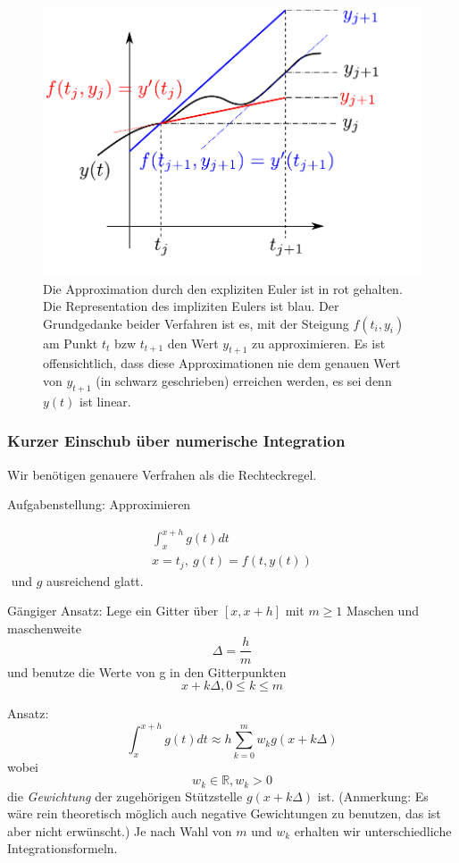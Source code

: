 \documentclass[10pt,a4paper]{article}
\begin{document}
\begin{figure}[H]
\includegraphics[width=\textwidth]{images/eulers_compared}
\caption{Die Approximation durch den expliziten Euler ist in rot gehalten. Die Representation des impliziten Eulers ist blau. Der Grundgedanke beider Verfahren ist es, mit der Steigung $f(t_i,y_i)$ am Punkt $t_t$ bzw $t_{t+1}$ den Wert $y_{t+1}$ zu approximieren. Es ist offensichtlich, dass diese Approximationen nie dem genauen Wert von $y_{t+1}$ (in schwarz geschrieben) erreichen werden, es sei denn $y(t)$ ist linear.}
\end{figure}

\subsubsection{Kurzer Einschub über numerische Integration}
Wir benötigen genauere Verfrahen als die Rechteckregel.

Aufgabenstellung: Approximieren 


\begin{eqnarray*}
\int^{x+h}_{x} g(t) dt \\
x=t_j, ~ g(t)=f(t,y(t))
\end{eqnarray*}
$  $ und $g$ ausreichend glatt.

Gängiger Ansatz: Lege ein Gitter über $[x,x+h]$ mit $m\geq1$ Maschen und maschenweite $$\Delta = \frac{h}{m}$$ und benutze die Werte von g in den Gitterpunkten $$x+k\Delta, 0 \leq k \leq m$$

Ansatz: $$\int^{x+h}_{x} g(t) dt \approx h \sum^{m}_{k=0} w_k g(x+k\Delta)$$ wobei $$w_k \in \mathbb{R}, w_k > 0$$ die \emph{Gewichtung} der zugehörigen Stützstelle $g(x+k \Delta)$ ist. (Anmerkung: Es wäre rein theoretisch möglich auch negative Gewichtungen zu benutzen, das ist aber nicht erwünscht.) Je nach Wahl von $m$ und $w_k$ erhalten wir unterschiedliche Integrationsformeln.
\end{document}
